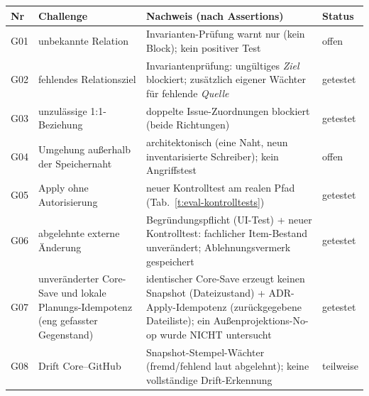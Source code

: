 
\begin{table}[htbp]
  \centering
  \small
  \begin{tabular}{l>{\raggedright\arraybackslash}p{}>{\raggedright\arraybackslash}p{}l}
    \hline
    \textbf{Nr} & \textbf{Challenge} & \textbf{Nachweis (nach Assertions)} & \textbf{Status} \\
    \hline
    G01 & unbekannte Relation & Invarianten-Prüfung warnt nur (kein Block); kein positiver Test & offen \\
    G02 & fehlendes Relationsziel & Invariantenprüfung: ungültiges \emph{Ziel} blockiert; zusätzlich eigener Wächter für fehlende \emph{Quelle} & getestet \\
    G03 & unzulässige 1:1-Beziehung & doppelte Issue-Zuordnungen blockiert (beide Richtungen) & getestet \\
    G04 & Umgehung außerhalb der Speichernaht & architektonisch (eine Naht, neun inventarisierte Schreiber); kein Angriffstest & offen \\
    G05 & Apply ohne Autorisierung & neuer Kontrolltest am realen Pfad (Tab.~\ref{t:eval-kontrolltests}) & getestet \\
    G06 & abgelehnte externe Änderung & Begründungspflicht (UI-Test) + neuer Kontrolltest: fachlicher Item-Bestand unverändert; Ablehnungsvermerk gespeichert & getestet \\
    G07 & unveränderter Core-Save und lokale Planungs-Idempotenz (eng gefasster Gegenstand) & identischer Core-Save erzeugt keinen Snapshot (Dateizustand) + ADR-Apply-Idempotenz (zurückgegebene Dateiliste); ein Außenprojektions-No-op wurde NICHT untersucht & getestet \\
    G08 & Drift Core--GitHub & Snapshot-Stempel-Wächter (fremd/fehlend laut abgelehnt); keine vollständige Drift-Erkennung & teilweise \\

\end{tabular}
\end{table}
